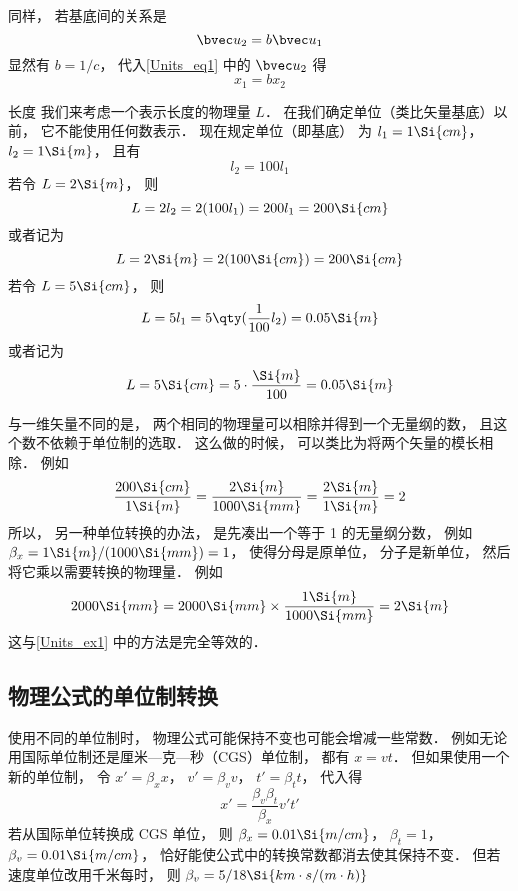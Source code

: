 同样， 若基底间的关系是
\begin{equation}
\bvec u_2 = b\bvec u_1
\end{equation}
显然有 $b = 1/c$， 代入\autoref{Units_eq1} 中的 $\bvec u_2$ 得
\begin{equation}
x_1 = b x_2
\end{equation}

\begin{example}{长度}\label{Units_ex1}
我们来考虑一个表示长度的物理量 $L$． 在我们确定单位（类比矢量基底）以前， 它不能使用任何数表示． 现在规定单位（即基底） 为 $l_1 = 1\Si{cm}$， $l_2 = 1\Si{m}$， 且有
\begin{equation}
l_2 = 100 l_1
\end{equation}
若令 $L = 2\Si{m}$， 则
\begin{equation}
L = 2 l_2 = 2 (100 l_1) = 200 l_1 = 200 \Si{cm}
\end{equation}
或者记为
\begin{equation}
L = 2 \Si{m} = 2 (100 \Si{cm}) = 200 \Si{cm}
\end{equation}
若令 $L = 5\Si{cm}$， 则
\begin{equation}
L = 5 l_1 = 5 \qty(\frac{1}{100} l_2) = 0.05 \Si{m}
\end{equation}
或者记为
\begin{equation}
L = 5 \Si{cm} = 5 \cdot \frac{\Si{m}}{100} = 0.05 \Si{m}
\end{equation}
\end{example}

与一维矢量不同的是， 两个相同的物理量可以相除并得到一个无量纲的数， 且这个数不依赖于单位制的选取． 这么做的时候， 可以类比为将两个矢量的模长相除． 例如
\begin{equation}
\frac{200\Si{cm}}{1\Si{m}} = \frac{2\Si{m}}{1000\Si{mm}} = \frac{2\Si{m}}{1\Si{m}} = 2
\end{equation}
所以， 另一种单位转换的办法， 是先凑出一个等于 1 的无量纲分数， 例如 $\beta_x = 1\Si{m}/(1000\Si{mm}) = 1$， 使得分母是原单位， 分子是新单位， 然后将它乘以需要转换的物理量． 例如
\begin{equation}
2000\Si{mm} = 2000\Si{mm} \times \frac{1\Si{m}}{1000\Si{mm}} = 2\Si{m}
\end{equation}
这与\autoref{Units_ex1} 中的方法是完全等效的．

\subsection{物理公式的单位制转换}
使用不同的单位制时， 物理公式可能保持不变也可能会增减一些常数． 例如无论用国际单位制还是厘米—克—秒（CGS）单位制， 都有 $x = vt$． 但如果使用一个新的单位制， 令 $x' = \beta_x x$， $v' = \beta_v v$， $t' = \beta_t t$， 代入得
\begin{equation}
x' = \frac{\beta_v\beta_t}{\beta_x} v' t'
\end{equation}
若从国际单位转换成 CGS 单位， 则 $\beta_x = 0.01 \Si{m/cm}$， $\beta_t = 1$， $\beta_v = 0.01 \Si{m/cm}$， 恰好能使公式中的转换常数都消去使其保持不变． 但若速度单位改用千米每时， 则 $\beta_v = 5/18 \Si{km\cdot s/(m\cdot h)}$

